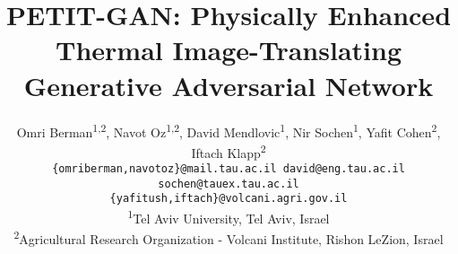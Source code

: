 \def \Title {PETIT-GAN: Physically Enhanced Thermal Image-Translating Generative Adversarial Network}
\def \addr {Israel}
\def \instOne {\textsuperscript{1}Tel Aviv University, Tel Aviv, Israel}
\def \instTwo {\textsuperscript{2}Agricultural Research Organization - Volcani Institute, Rishon LeZion, Israel}

\title{\Title}
\author{Omri Berman\textsuperscript{1,2}, Navot Oz\textsuperscript{1,2}, David Mendlovic\textsuperscript{1}, Nir Sochen\textsuperscript{1}, Yafit Cohen\textsuperscript{2}, Iftach Klapp\textsuperscript{2}\\
{\tt\small \{omriberman,navotoz\}@mail.tau.ac.il david@eng.tau.ac.il sochen@tauex.tau.ac.il}\\
{\tt\small \{yafitush,iftach\}@volcani.agri.gov.il}\\
\instOne\\ 
\instTwo
}
\maketitle